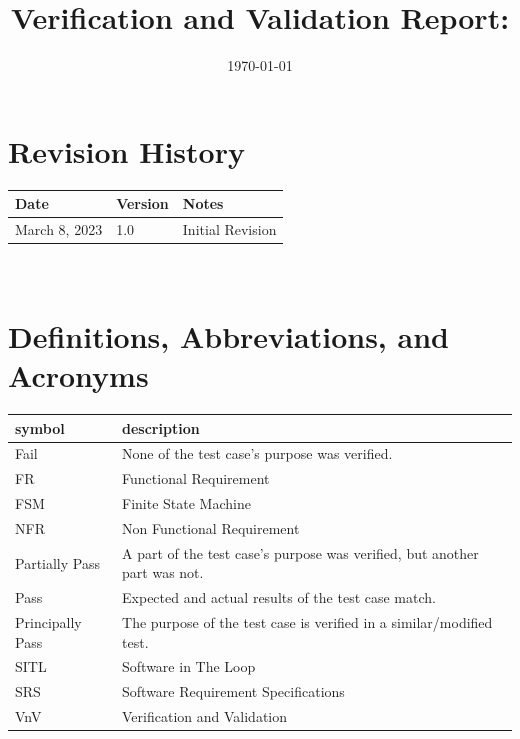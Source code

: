 \documentclass[12pt, titlepage]{article}
\begin{document}
\title{Verification and Validation Report: \progname} 
\author{\authname}
\date{\today}
	
\maketitle


\section{Revision History}

\begin{tabularx}{\textwidth}{p{3cm}p{2cm}X}
\toprule {\bf Date} & {\bf Version} & {\bf Notes}\\
\midrule
March 8, 2023 & 1.0 & Initial Revision \\
\bottomrule
\end{tabularx}

~\newpage

\section{Definitions, Abbreviations, and Acronyms}
\label{sec:defAbrev}

\renewcommand{\arraystretch}{1.2}
\begin{tabular}{l l} 
  \toprule		
  \textbf{symbol} & \textbf{description}\\
  \midrule 
  Fail & None of the test case's purpose was verified. \\
  FR & Functional Requirement \\
  FSM & Finite State Machine \\
  NFR & Non Functional Requirement \\
  Partially Pass & A part of the test case's purpose was verified, but another part was not. \\
  Pass & Expected and actual results of the test case match. \\
  Principally Pass & The purpose of the test case is verified in a similar/modified test. \\
  SITL & Software in The Loop \\
  SRS & Software Requirement Specifications \\
  VnV & Verification and Validation \\
  \bottomrule
\end{tabular}\\
\end{document}
